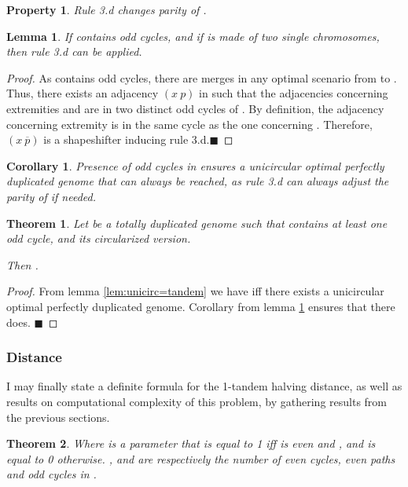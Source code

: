 \documentclass[11pt,final,twoside,nofrench]{thlifl}
\newcommand{\qed}{\ensuremath{\blacksquare}}
\newcommand{\fst}[1]{ \ensuremath{#1} }
\newcommand{\snd}[1]{ \ensuremath{\overline{#1}} }
\newcommand\aff[2]{\ensuremath{(\fst{#1}~\fst{#2})}}
\newcommand\afs[2]{\ensuremath{(\fst{#1}~\snd{#2})}}
\newtheorem{property}{Property}
\newtheorem{proof}{Proof}
\newtheorem{theorem}{Theorem}
\newtheorem{lemma}{Lemma}
\newtheorem{corollary}{Corollary}
\begin{document}
{\begin{property}
Rule 3.d changes parity of .
\end{property}

\begin{lemma}
\label{lem:parity}
If  contains odd cycles, and if  is made of two single chromosomes, then rule 3.d can be applied.
\end{lemma}
\begin{proof}
As  contains odd cycles, there are merges in any optimal scenario from  to . Thus, there exists an adjacency \aff{x}{p} in  such that the adjacencies concerning extremities  and  are in two distinct odd cycles of . By definition, the adjacency concerning extremity  is in the same cycle as the one concerning .
Therefore, \afs{x}{p} is a shapeshifter inducing rule 3.d.\qed
\end{proof}
\begin{corollary}
Presence of odd cycles in  ensures a unicircular optimal
perfectly duplicated genome that can always be reached, as rule 3.d can always adjust the parity of  if needed. \end{corollary}

\begin{theorem}
\label{th:generalized}
Let  be a totally duplicated genome such that  contains at least one odd cycle, and  its circularized version.

Then .
\end{theorem}

\begin{proof} 
    From lemma \ref{lem:unicirc=tandem} we have  iff there exists a unicircular optimal perfectly
    duplicated genome.  Corollary from lemma \ref{lem:parity} ensures
    that there does. \qed
\end{proof}

\subsubsection{Distance}

I may finally state a definite formula for the 1-tandem halving distance, as well as results on computational complexity of this problem, by gathering results from the previous sections.

\begin{theorem}



Where  is a parameter that is equal to 1 iff  is even and , and is equal to 0 otherwise. ,  and  are respectively the number of even cycles, even paths and odd cycles in .


\end{theorem}}
\end{document}
